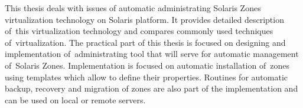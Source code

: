 This thesis deals with issues of automatic administrating Solaris Zones virtualization technology on Solaris platform.
It provides detailed description of~this virtualization technology and compares commonly used techniques of~virtualization.
The practical part of this thesis is focused on designing and implementation of~administrating tool that will serve for automatic
management of~Solaris Zones. Implementation is focused on automatic installation of~zones using templates which allow to define
their properties. Routines for automatic backup, recovery and migration of zones are also part of the implementation and can be
used on local or remote servers.
